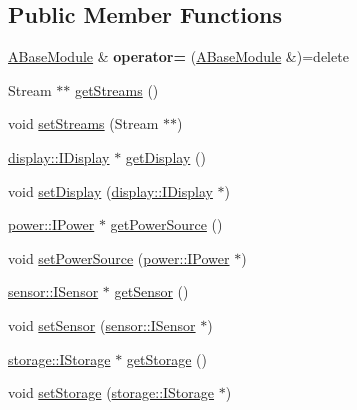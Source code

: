 \subsection*{Public Member Functions}
\begin{DoxyCompactItemize}
\item 
\mbox{\label{classathome_1_1module_1_1_a_base_module_ac1444e438bcfcc06f6593e3d4d5fb1fe}} 
\mbox{\hyperlink{classathome_1_1module_1_1_a_base_module}{A\+Base\+Module}} \& {\bfseries operator=} (\mbox{\hyperlink{classathome_1_1module_1_1_a_base_module}{A\+Base\+Module}} \&)=delete
\item 
Stream $\ast$$\ast$ \mbox{\hyperlink{classathome_1_1module_1_1_a_base_module_adc612512d2acb7bc3f3d533bcc1aa41b}{get\+Streams}} ()
\item 
void \mbox{\hyperlink{classathome_1_1module_1_1_a_base_module_af1af8e6110a8d0baee15efb2275ae5ae}{set\+Streams}} (Stream $\ast$$\ast$)
\item 
\mbox{\hyperlink{classathome_1_1display_1_1_i_display}{display\+::\+I\+Display}} $\ast$ \mbox{\hyperlink{classathome_1_1module_1_1_a_base_module_ada20b6ad1e6f750d2886f1e7b10cca70}{get\+Display}} ()
\item 
void \mbox{\hyperlink{classathome_1_1module_1_1_a_base_module_a451a1fb99905c7d21f3a818ee39acc69}{set\+Display}} (\mbox{\hyperlink{classathome_1_1display_1_1_i_display}{display\+::\+I\+Display}} $\ast$)
\item 
\mbox{\hyperlink{classathome_1_1power_1_1_i_power}{power\+::\+I\+Power}} $\ast$ \mbox{\hyperlink{classathome_1_1module_1_1_a_base_module_a3152f721f953e32a1f965856936d188e}{get\+Power\+Source}} ()
\item 
void \mbox{\hyperlink{classathome_1_1module_1_1_a_base_module_a0c217f9a8d052efc5490bc9145fdf7f9}{set\+Power\+Source}} (\mbox{\hyperlink{classathome_1_1power_1_1_i_power}{power\+::\+I\+Power}} $\ast$)
\item 
\mbox{\hyperlink{classathome_1_1sensor_1_1_i_sensor}{sensor\+::\+I\+Sensor}} $\ast$ \mbox{\hyperlink{classathome_1_1module_1_1_a_base_module_abd4cf0d059639c4d09f35d7b1ddd2b4e}{get\+Sensor}} ()
\item 
void \mbox{\hyperlink{classathome_1_1module_1_1_a_base_module_a071b5d07dc3497908520a5b0dc9404ef}{set\+Sensor}} (\mbox{\hyperlink{classathome_1_1sensor_1_1_i_sensor}{sensor\+::\+I\+Sensor}} $\ast$)
\item 
\mbox{\hyperlink{classathome_1_1storage_1_1_i_storage}{storage\+::\+I\+Storage}} $\ast$ \mbox{\hyperlink{classathome_1_1module_1_1_a_base_module_accc6c7f840dab1b1e67fe910c833f0b7}{get\+Storage}} ()
\item 
void \mbox{\hyperlink{classathome_1_1module_1_1_a_base_module_a91e714579636e6f4a3628a23a8ba61e7}{set\+Storage}} (\mbox{\hyperlink{classathome_1_1storage_1_1_i_storage}{storage\+::\+I\+Storage}} $\ast$)
\end{DoxyCompactItemize}
